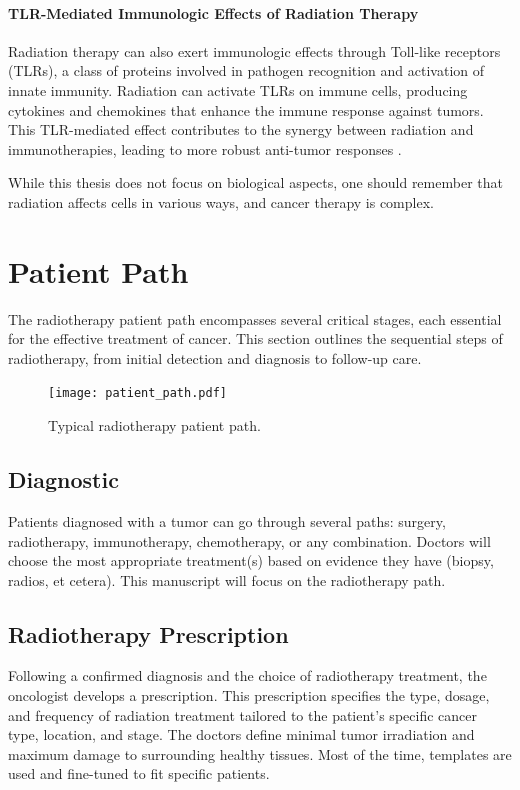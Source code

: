 \paragraph{TLR-Mediated Immunologic Effects of Radiation Therapy}
Radiation therapy can also exert immunologic effects through Toll-like receptors (TLRs), a class of proteins involved in pathogen recognition and activation of innate immunity.
Radiation can activate TLRs on immune cells, producing cytokines and chemokines that enhance the immune response against tumors.
This TLR-mediated effect contributes to the synergy between radiation and immunotherapies, leading to more robust anti-tumor responses \cite{Walshan2020}.

While this thesis does not focus on biological aspects, one should remember that radiation affects cells in various ways, and cancer therapy is complex.






\section{Patient Path}
The radiotherapy patient path encompasses several critical stages, each essential for the effective treatment of cancer.
This section outlines the sequential steps of radiotherapy, from initial detection and diagnosis to follow-up care.
\begin{figure}
	\centering
	\texttt{[image: patient\_path.pdf]}
	\caption{Typical radiotherapy patient path.}
	\label{fig:patient_path}
\end{figure}

\subsection{Diagnostic}
Patients diagnosed with a tumor can go through several paths: surgery, radiotherapy, immunotherapy, chemotherapy, or any combination.
Doctors will choose the most appropriate treatment(s) based on evidence they have (biopsy, radios, et cetera).
This manuscript will focus on the radiotherapy path.

\subsection{Radiotherapy Prescription}
Following a confirmed diagnosis and the choice of radiotherapy treatment, the oncologist develops a prescription.
This prescription specifies the type, dosage, and frequency of radiation treatment tailored to the patient's specific cancer type, location, and stage.
The doctors define minimal tumor irradiation and maximum damage to surrounding healthy tissues.
Most of the time, templates are used and fine-tuned to fit specific patients.


